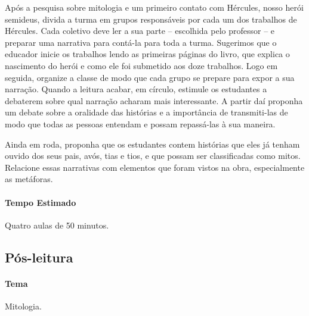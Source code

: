 \documentclass[11pt]{extarticle}
\begin{document}
Após a pesquisa sobre mitologia e um primeiro contato com Hércules, nosso herói semideus, divida a turma em grupos responsáveis por cada um dos trabalhos de Hércules. Cada coletivo deve ler a sua parte -- escolhida pelo professor -- e preparar uma narrativa para contá-la para toda a turma. Sugerimos que o educador inicie os trabalhos lendo as primeiras páginas do livro, que explica o nascimento do herói e como ele foi submetido aos doze trabalhos. Logo em seguida, organize a classe de modo que cada grupo se prepare para expor a sua narração. Quando a leitura acabar, em círculo, estimule os estudantes a debaterem sobre qual narração acharam mais interessante. A partir daí proponha um debate sobre a oralidade das histórias e a importância de transmiti-las de modo que todas as pessoas entendam e possam repassá-las à sua maneira. 

Ainda em roda, proponha que os estudantes contem histórias que eles já tenham ouvido dos seus pais, avós, tias e tios, e que possam ser classificadas como mitos. Relacione essas narrativas com elementos que foram vistos na obra, especialmente as metáforas. 


\paragraph{Tempo Estimado} Quatro aulas de 50 minutos.

\subsection{Pós-leitura}


\paragraph{Tema} Mitologia. 
\end{document}

